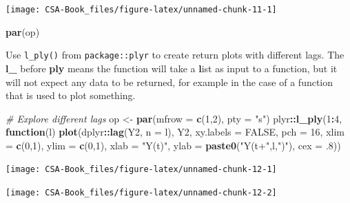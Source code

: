 \documentclass[12pt,]{book}
\newenvironment{Shaded}{\begin{snugshade}}{\end{snugshade}}
\newcommand{\CommentTok}[1]{\textcolor[rgb]{0.56,0.35,0.01}{\textit{#1}}}
\newcommand{\ControlFlowTok}[1]{\textcolor[rgb]{0.13,0.29,0.53}{\textbf{#1}}}
\newcommand{\DataTypeTok}[1]{\textcolor[rgb]{0.13,0.29,0.53}{#1}}
\newcommand{\DecValTok}[1]{\textcolor[rgb]{0.00,0.00,0.81}{#1}}
\newcommand{\FloatTok}[1]{\textcolor[rgb]{0.00,0.00,0.81}{#1}}
\newcommand{\KeywordTok}[1]{\textcolor[rgb]{0.13,0.29,0.53}{\textbf{#1}}}
\newcommand{\NormalTok}[1]{#1}
\newcommand{\OperatorTok}[1]{\textcolor[rgb]{0.81,0.36,0.00}{\textbf{#1}}}
\newcommand{\OtherTok}[1]{\textcolor[rgb]{0.56,0.35,0.01}{#1}}
\newcommand{\StringTok}[1]{\textcolor[rgb]{0.31,0.60,0.02}{#1}}
\begin{document}
\begin{center}\texttt{[image: CSA-Book\_files/figure-latex/unnamed-chunk-11-1]} \end{center}

\begin{Shaded}
\begin{Highlighting}[]
\KeywordTok{par}\NormalTok{(op)}
\end{Highlighting}
\end{Shaded}

Use \texttt{l\_ply()} from \texttt{package::plyr} to create return plots with different lags. The \textbf{l\_} before \textbf{ply} means the function will take a \textbf{l}ist as input to a function, but it will not expect any data to be returned, for example in the case of a function that is used to plot something.

\begin{Shaded}
\begin{Highlighting}[]
\CommentTok{# Explore different lags}
\NormalTok{op <-}\StringTok{ }\KeywordTok{par}\NormalTok{(}\DataTypeTok{mfrow =} \KeywordTok{c}\NormalTok{(}\DecValTok{1}\NormalTok{,}\DecValTok{2}\NormalTok{), }\DataTypeTok{pty =} \StringTok{"s"}\NormalTok{)}
\NormalTok{plyr}\OperatorTok{::}\KeywordTok{l_ply}\NormalTok{(}\DecValTok{1}\OperatorTok{:}\DecValTok{4}\NormalTok{, }\ControlFlowTok{function}\NormalTok{(l) }\KeywordTok{plot}\NormalTok{(dplyr}\OperatorTok{::}\KeywordTok{lag}\NormalTok{(Y2, }\DataTypeTok{n =}\NormalTok{ l), Y2, }\DataTypeTok{xy.labels =} \OtherTok{FALSE}\NormalTok{, }\DataTypeTok{pch =} \DecValTok{16}\NormalTok{, }\DataTypeTok{xlim =} \KeywordTok{c}\NormalTok{(}\DecValTok{0}\NormalTok{,}\DecValTok{1}\NormalTok{), }\DataTypeTok{ylim =} \KeywordTok{c}\NormalTok{(}\DecValTok{0}\NormalTok{,}\DecValTok{1}\NormalTok{), }\DataTypeTok{xlab =} \StringTok{"Y(t)"}\NormalTok{, }\DataTypeTok{ylab =} \KeywordTok{paste0}\NormalTok{(}\StringTok{"Y(t+"}\NormalTok{,l,}\StringTok{")"}\NormalTok{), }\DataTypeTok{cex =} \FloatTok{.8}\NormalTok{))}
\end{Highlighting}
\end{Shaded}

\begin{center}\texttt{[image: CSA-Book\_files/figure-latex/unnamed-chunk-12-1]} \end{center}

\begin{center}\texttt{[image: CSA-Book\_files/figure-latex/unnamed-chunk-12-2]} \end{center}
\end{document}
